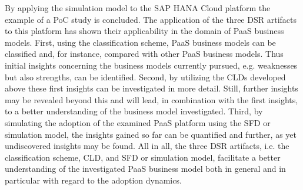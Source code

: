 By applying the simulation model to the SAP HANA Cloud platform the example of a \ac{PoC} study is concluded. The application of the three \ac{DSR} artifacts to this platform has shown their applicability in the domain of \ac{PaaS} business models. First, using the classification scheme, \ac{PaaS} business models can be classified and, for instance, compared with other \ac{PaaS} business models. Thus initial insights concerning the business models currently pursued, e.g. weaknesses but also strengths, can be identified. Second, by utilizing the \acp{CLD} developed above these first insights can be investigated in more detail. Still, further insights may be revealed beyond this and will lead, in combination with the first insights, to a better understanding of the business model investigated. Third, by simulating the adoption of the examined \ac{PaaS} platform using the \ac{SFD} or simulation model, the insights gained so far can be quantified and further, as yet undiscovered insights may be found. All in all, the three \ac{DSR} artifacts, i.e. the classification scheme, \ac{CLD}, and \ac{SFD} or simulation model, facilitate a better understanding of the investigated \ac{PaaS} business model both in general and in particular with regard to the adoption dynamics.

\begin{comment}
	\begin{figure}[htb]
		\centering
		
		\caption{Proof of Concept Simulation -- Customers}
	\end{figure}

	\begin{figure}[htb]
		\centering
		
		\caption{Proof of Concept Simulation -- Potential Customers}
	\end{figure}
\end{comment}